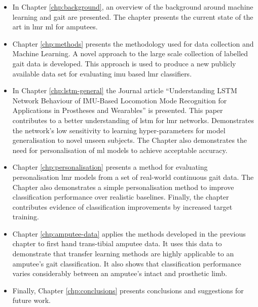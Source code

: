 \begin{itemize}
    \item In Chapter \ref{chp:background}, an overview of the background around machine learning and gait are presented. The chapter presents the current state of the art in \acrlong{lmr} \acrshort{ml} for amputees.
    
    \item Chapter \ref{chp:methods} presents the methodology used for data collection and Machine Learning. A novel approach to the large scale collection of labelled gait data is developed. This approach is used to produce a new publicly available data set for evaluating \acrlong{imu} based \acrshort{lmr} classifiers.
    
    \item In Chapter \ref{chp:lstm-general} the Journal article ``Understanding LSTM Network Behaviour of IMU-Based Locomotion Mode Recognition for Applications in Prostheses and Wearables'' is presented. This paper contributes to a better understanding of \acrlong{lstm} for \acrshort{lmr} networks. Demonstrates the network's low sensitivity to learning hyper-parameters for model generalisation to novel unseen subjects. The Chapter also demonstrates the need for personalisation of \acrshort{ml} models to achieve acceptable accuracy.
    
    \item Chapter \ref{chp:personalisation} presents a method for evaluating personalisation \acrshort{lmr} models from a set of real-world continuous gait data. The Chapter also demonstrates a simple personalisation method to improve classification performance over realistic baselines. Finally, the chapter contributes evidence of classification improvements by increased target training.
    
    \item Chapter \ref{chp:amputee-data} applies the methods developed in the previous chapter to first hand trans-tibial amputee data. It uses this data to demonstrate that transfer learning methods are highly applicable to an amputee's gait classification. It also shows that classification performance varies considerably between an amputee's intact and prosthetic limb.
    
    \item Finally, Chapter \ref{chp:conclusions} presents conclusions and suggestions for future work.
\end{itemize}
